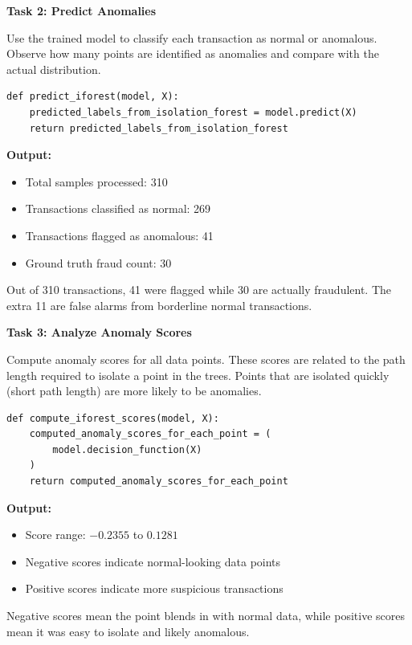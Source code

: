 \documentclass[12pt,a4paper]{article}
\begin{document}
\vspace{14pt}

\begin{tcolorbox}
\textbf{Task 2: Predict Anomalies}

Use the trained model to classify each transaction as normal or anomalous. 
Observe how many points are identified as anomalies and compare with the 
actual distribution.

\begin{lstlisting}
def predict_iforest(model, X):
    predicted_labels_from_isolation_forest = model.predict(X)
    return predicted_labels_from_isolation_forest
\end{lstlisting}

\textbf{Output:}
\begin{itemize}
\item Total samples processed: 310
\item Transactions classified as normal: 269
\item Transactions flagged as anomalous: 41
\item Ground truth fraud count: 30
\end{itemize}

Out of 310 transactions, 41 were flagged while 30 are actually fraudulent. The extra 11 are false alarms from borderline normal transactions.

\end{tcolorbox}

\vspace{14pt}

\begin{tcolorbox}
\textbf{Task 3: Analyze Anomaly Scores}

Compute anomaly scores for all data points. These scores are related to 
the path length required to isolate a point in the trees. Points that are 
isolated quickly (short path length) are more likely to be anomalies.

\begin{lstlisting}
def compute_iforest_scores(model, X):
    computed_anomaly_scores_for_each_point = (
        model.decision_function(X)
    )
    return computed_anomaly_scores_for_each_point
\end{lstlisting}

\textbf{Output:}
\begin{itemize}
\item Score range: $-0.2355$ to $0.1281$
\item Negative scores indicate normal-looking data points
\item Positive scores indicate more suspicious transactions
\end{itemize}

Negative scores mean the point blends in with normal data, while positive scores mean it was easy to isolate and likely anomalous.

\end{tcolorbox}
\end{document}
